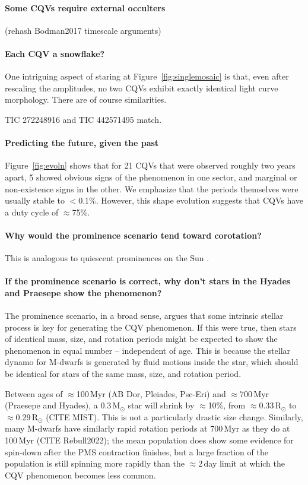 \documentclass[11pt,twocolumn,tighten]{aastex63}
\begin{document}
\paragraph{Some CQVs require external occulters}
(rehash Bodman2017 timescale arguments)


\paragraph{Each CQV a snowflake?}
One intriguing aspect of staring at Figure~\ref{fig:singlemosaic}
is that, even after rescaling the amplitudes, no two CQVs
exhibit exactly identical light curve morphology.
There are of course similarities.

TIC 272248916 and TIC 442571495 match.


\paragraph{Predicting the future, given the past}
Figure~\ref{fig:evoln}
shows that for 21 CQVs that were observed roughly two years
apart, 5 showed obvious signs of the phenomenon in one sector,
and marginal or non-existence signs in the other.
We emphasize that the periods themselves were usually stable to $<$0.1\%.
However, this shape evolution
suggests that CQVs have a duty cycle of $\approx$75\%.


\paragraph{Why would the prominence scenario tend toward corotation?}
This is analogous to quiescent
prominences on the Sun \citep{1967SoPh....2...39K}.


\paragraph{If the prominence scenario is correct, why don't stars in the
Hyades and Praesepe show the phenomenon?}

The prominence scenario, in a broad sense, argues that some intrinsic
stellar process is key for generating the CQV phenomenon.
If this were true, then stars of identical mass, size, and rotation
periods might be expected to show the phenomenon in equal number --
independent of age.
This is because the stellar dynamo for M-dwarfs is generated by fluid
motions inside the star, which should be identical for stars of the
same mass, size, and rotation period.

Between ages of $\approx$100\,Myr (AB Dor, Pleiades, Psc-Eri) and
$\approx$700\,Myr (Praesepe and Hyades), a 0.3\,M$_\odot$ star will
shrink by $\approx$10\%, from $\approx$0.33\,R$_\odot$ to 
$\approx$0.29\,R$_\odot$ (CITE MIST).
This is not a particularly drastic size change.
Similarly, many M-dwarfs  have similarly rapid rotation periods 
at 700\,Myr as they do at 100\,Myr (CITE Rebull2022); 
the mean population does show some evidence for spin-down after the
PMS contraction finishes, but a large fraction of the population is
still spinning more rapidly than the $\approx$2\,day limit at which
the CQV phenomenon becomes less common.
\end{document}
